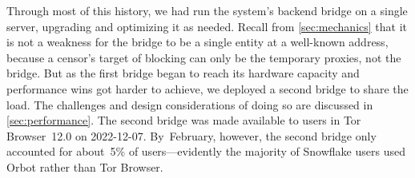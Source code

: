 \documentclass[letterpaper,twocolumn]{article}
\begin{document}
Through most of this history,
we had run the system's backend bridge on a single server,
upgrading and optimizing it as needed.
Recall from \autoref{sec:mechanics} that it is not a weakness
for the bridge to be a single entity at a well-known address,
because a censor's target of blocking can only be the temporary proxies, not the bridge.
But as the first bridge began to reach its hardware capacity
and performance wins got harder to achieve,
we deployed a second bridge to share the load.
The challenges and design considerations of doing so are discussed in \autoref{sec:performance}.
The second bridge was made available to users in
Tor Browser~12.0 on \mbox{2022-12-07}.
By~February, however, the second bridge only accounted for about~5\%
of users---evidently the majority of Snowflake users used Orbot
rather than Tor Browser.
\end{document}
